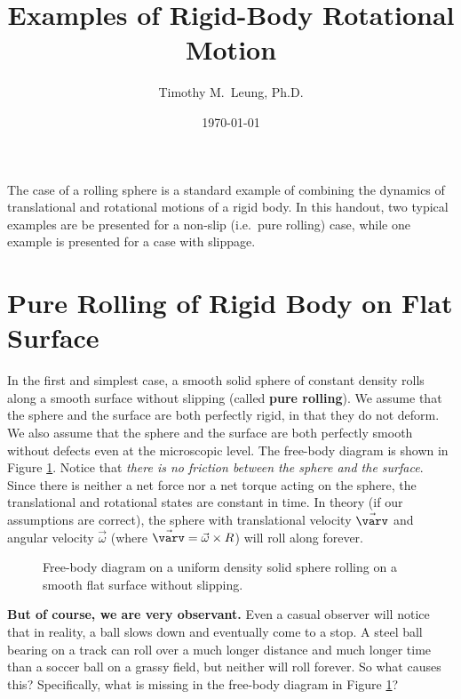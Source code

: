 \documentclass{../../oss-handout}
\title{Examples of Rigid-Body Rotational Motion}
\author{Timothy M.\ Leung, Ph.D.}
\date{\today}
\begin{document}
\thispagestyle{title}
\gentitle

The case of a rolling sphere is a standard example of combining the dynamics of
translational and rotational motions of a rigid body. In this handout, two
typical examples are be presented for a non-slip (i.e.\ pure rolling) case,
while one example is presented for a case with slippage.

\section{Pure Rolling of Rigid Body on Flat Surface}
\label{no-slip-ball}
In the first and simplest case, a smooth solid sphere of constant density rolls
along a smooth surface without slipping (called \textbf{pure rolling}). We
assume that the sphere and the surface are both perfectly rigid, in that they
do not deform. We also assume that the sphere and the surface are both
perfectly smooth without defects even at the microscopic level. The free-body
diagram is shown in Figure \ref{roll-flat}. Notice that
\emph{there is no friction between the sphere and the surface}. Since there is
neither a net force nor a net torque acting on the sphere, the translational
and rotational states are constant in time. In theory (if our assumptions are
correct), the sphere with translational velocity $\vec\varv$ and angular
velocity $\vec\omega$ (where $\vec\varv=\vec\omega\times R$) will roll along
forever.
\begin{figure}[!ht]
  \centering
  \caption{Free-body diagram on a uniform density solid sphere rolling on a
    smooth flat surface without slipping.}
  \label{roll-flat}
\end{figure}

\textbf{But of course, we are very observant.} Even a casual observer will
notice that in reality, a ball slows down and eventually come to a stop. A
steel ball bearing on a track can roll over a much longer distance and
much longer time than a soccer ball on a grassy field, but neither will roll
forever. So what causes this? Specifically, what is missing in the free-body
diagram in Figure \ref{roll-flat}?
\newpage
\end{document}
